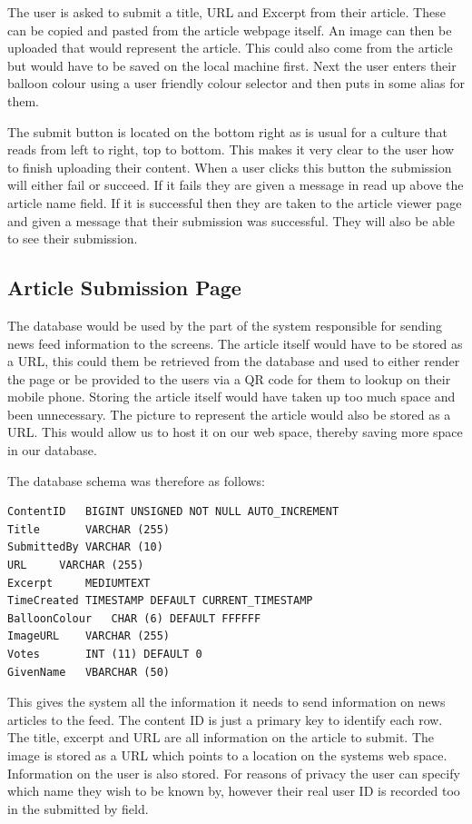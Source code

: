 The user is asked to submit a title, URL and Excerpt from their article. These can be copied and pasted from the article webpage itself. An image can then be uploaded that would represent the article. This could also come from the article but would have to be saved on the local machine first. Next the user enters their balloon colour using a user friendly colour selector and then puts in some alias for them. 

The submit button is located on the bottom right as is usual for a culture that reads from left to right, top to bottom. This makes it very clear to the user how to finish uploading their content. When a user clicks this button the submission will either fail or succeed. If it fails they are given a message in read up above the article name field. If it is successful then they are taken to the article viewer page and given a message that their submission was successful. They will also be able to see their submission.

\subsection{Article Submission Page}
The database would be used by the part of the system responsible for sending news feed information to the screens. The article itself would have to be stored as a URL, this could them be retrieved from the database and used to either render the page or be provided to the users via a QR code for them to lookup on their mobile phone. Storing the article itself would have taken up too much space and been unnecessary. The picture to represent the article would also be stored as a URL. This would allow us to host it on our web space, 
thereby saving more space in our database. 

The database schema was therefore as follows: 

\begin{verbatim}ContentID	BIGINT UNSIGNED NOT NULL AUTO_INCREMENT
Title		VARCHAR (255)
SubmittedBy	VARCHAR (10)
URL		VARCHAR (255)
Excerpt		MEDIUMTEXT
TimeCreated	TIMESTAMP DEFAULT CURRENT_TIMESTAMP
BalloonColour	CHAR (6) DEFAULT FFFFFF
ImageURL	VARCHAR (255)
Votes		INT (11) DEFAULT 0
GivenName	VBARCHAR (50)\end{verbatim}

This gives the system all the information it needs to send information on news articles to the feed. The content ID is just a primary key to identify each row. The title, excerpt and URL are all information on the article to submit. The image is stored as a URL which points to a location on the systems web space. Information on the user is also stored. For reasons of privacy the user can specify which name they wish to be known by, however their real user ID is recorded too in the submitted by field.

